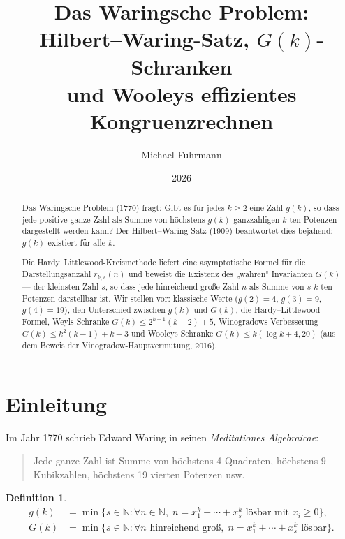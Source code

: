 \documentclass[12pt,a4paper]{amsart}
\theoremstyle{definition}
\newtheorem{definition}[theorem]{Definition}
\newcommand{\N}{\mathbb{N}}
\begin{document}
\title{Das Waringsche Problem:\\
       Hilbert--Waring-Satz, $G(k)$-Schranken\\
       und Wooleys effizientes Kongruenzrechnen}

\author{Michael Fuhrmann}
\address{Specialist Mathematics Project, Build 80}
\date{2026}

\begin{abstract}
Das Waringsche Problem (1770) fragt: Gibt es für jedes $k \geq 2$ eine Zahl
$g(k)$, so dass jede positive ganze Zahl als Summe von höchstens $g(k)$
ganzzahligen $k$-ten Potenzen dargestellt werden kann?  Der Hilbert--Waring-Satz
(1909) beantwortet dies bejahend: $g(k)$ existiert für alle $k$.

Die Hardy--Littlewood-Kreismethode liefert eine asymptotische Formel für
die Darstellungsanzahl $r_{k,s}(n)$ und beweist die Existenz des „wahren"
Invarianten $G(k)$ — der kleinsten Zahl $s$, so dass jede hinreichend
große Zahl $n$ als Summe von $s$ $k$-ten Potenzen darstellbar ist.
Wir stellen vor: klassische Werte ($g(2)=4$, $g(3)=9$, $g(4)=19$),
den Unterschied zwischen $g(k)$ und $G(k)$, die Hardy--Littlewood-Formel,
Weyls Schranke $G(k) \leq 2^{k-1}(k-2)+5$, Winogradows Verbesserung
$G(k) \leq k^2(k-1)+k+3$ und Wooleys Schranke $G(k) \leq k(\log k + 4{,}20)$
(aus dem Beweis der Vinogradow-Hauptvermutung, 2016).
\end{abstract}

\maketitle
\tableofcontents

\section{Einleitung}

Im Jahr 1770 schrieb Edward Waring in seinen \emph{Meditationes Algebraicae}:
\begin{quote}
  Jede ganze Zahl ist Summe von höchstens 4 Quadraten, höchstens 9 Kubikzahlen,
  höchstens 19 vierten Potenzen usw.
\end{quote}

\begin{definition}
  \begin{align*}
    g(k) &= \min\bigl\{s \in \N : \forall n \in \N,\;
              n = x_1^k + \cdots + x_s^k \text{ lösbar mit } x_i \geq 0\bigr\}, \\
    G(k) &= \min\bigl\{s \in \N : \forall n \text{ hinreichend groß},\;
              n = x_1^k + \cdots + x_s^k \text{ lösbar}\bigr\}.
  \end{align*}
\end{definition}
\end{document}
